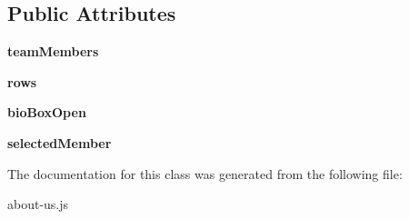 \subsection*{Public Attributes}
\begin{DoxyCompactItemize}
\item 
\hypertarget{classabout__us__module_1_1teamBioController_a559070080670303b17b2aa55cdd8b5fe}{{\bfseries team\-Members}}\label{classabout__us__module_1_1teamBioController_a559070080670303b17b2aa55cdd8b5fe}

\item 
\hypertarget{classabout__us__module_1_1teamBioController_a453d263908482fbd4e4e4aef58979580}{{\bfseries rows}}\label{classabout__us__module_1_1teamBioController_a453d263908482fbd4e4e4aef58979580}

\item 
\hypertarget{classabout__us__module_1_1teamBioController_a7bc7fb00d90a0cdadadb2a18e442f7b0}{{\bfseries bio\-Box\-Open}}\label{classabout__us__module_1_1teamBioController_a7bc7fb00d90a0cdadadb2a18e442f7b0}

\item 
\hypertarget{classabout__us__module_1_1teamBioController_adccbfbece4982f8b353dd7676e86d5a2}{{\bfseries selected\-Member}}\label{classabout__us__module_1_1teamBioController_adccbfbece4982f8b353dd7676e86d5a2}

\end{DoxyCompactItemize}


The documentation for this class was generated from the following file\-:\begin{DoxyCompactItemize}
\item 
about-\/us.\-js\end{DoxyCompactItemize}
